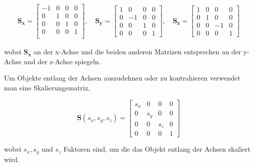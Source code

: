 \begin{align*}
    \boldsymbol{S_x} = 
    \begin{bmatrix}
        -1 & 0 & 0 & 0 \\
        0 & 1 & 0 & 0 \\
        0 & 0 & 1 & 0 \\
        0 & 0 & 0 & 1 \\        
    \end{bmatrix}, \quad
    \boldsymbol{S_y} = 
    \begin{bmatrix}
        1 & 0 & 0 & 0 \\
        0 & -1 & 0 & 0 \\
        0 & 0 & 1 & 0 \\
        0 & 0 & 0 & 1
    \end{bmatrix}, \quad
    \boldsymbol{S_z} =
    \begin{bmatrix}
        1 & 0 & 0 & 0 \\
        0 & 1 & 0 & 0 \\
        0 & 0 & -1 & 0 \\
        0 & 0 & 0 & 1
    \end{bmatrix}
\end{align*}

wobei \( \boldsymbol{S_x} \) an der x-Achse und die beiden anderen Matrizen entsprechen an der y-Achse und der z-Achse spiegeln.

Um Objekte entlang der Achsen auszudehnen oder zu kontrahieren verwendet man eine Skalierungsmatrix,

\begin{equation*}
    \boldsymbol{S}(s_x, s_y, s_z) =
    \begin{bmatrix}
        s_x & 0 & 0 & 0 \\
        0 & s_y & 0 & 0 \\
        0 & 0 & s_z & 0 \\
        0 & 0 & 0 & 1
    \end{bmatrix}
\end{equation*}

wobei \( s_x, s_y \text{ und } s_z\) Faktoren sind, um die das Objekt entlang der Achsen skaliert wird.





